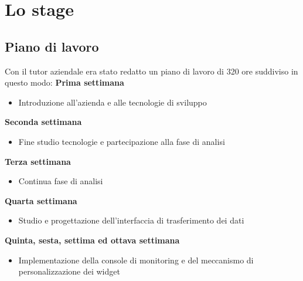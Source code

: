 \documentclass[a4paper, 12pt, twoside, openright]{book}
\begin{document}
\chapter{Lo stage}

\section{Piano di lavoro}
Con il tutor aziendale era stato redatto un piano di lavoro di 320 ore suddiviso in questo modo:
\textbf{Prima settimana}
\begin{itemize}
\item Introduzione all'azienda e alle tecnologie di sviluppo
\end{itemize}
\textbf{Seconda settimana}
\begin{itemize}
\item Fine studio tecnologie e partecipazione alla fase di analisi
\end{itemize}
\textbf{Terza settimana}
\begin{itemize}
\item Continua fase di analisi
\end{itemize}
\textbf{Quarta settimana}
\begin{itemize}
\item Studio e progettazione dell'interfaccia di trasferimento dei dati
\end{itemize}
\textbf{Quinta, sesta, settima ed ottava settimana}
\begin{itemize}
\item Implementazione della console di monitoring e del meccanismo di personalizzazione dei widget
\end{itemize}
\end{document}
